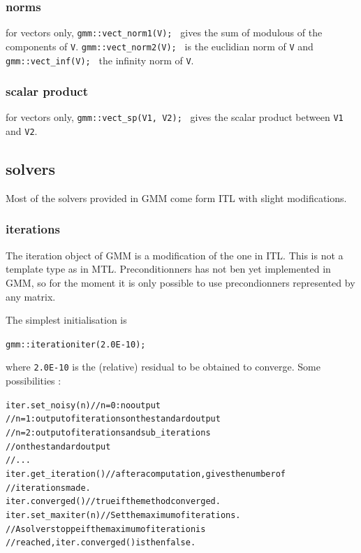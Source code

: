 \documentclass[11pt,a4paper]{article}
\begin{document}
\subsubsection{norms}
  for vectors only, {\tt gmm::vect_norm1(V); } gives the sum of modulous of the components of {\tt V}. {\tt gmm::vect_norm2(V); } is the euclidian norm of {\tt V} and {\tt gmm::vect_inf(V); } the infinity norm of {\tt V}.

\subsubsection{scalar product}
  for vectors only, {\tt gmm::vect_sp(V1, V2); } gives the scalar product between {\tt V1} and {\tt V2}.


\subsection{solvers}
Most of the solvers provided in GMM come form ITL with slight modifications.

\subsubsection{iterations}
  The iteration object of GMM is a modification of the one in ITL. This is not a template type as in MTL. Preconditionners has not ben yet implemented in GMM, so for the moment it is only possible to use precondionners represented by any matrix. 

The simplest initialisation is
\begin{alltt}
  gmm::iteration iter(2.0E-10);
\end{alltt}
where {\tt 2.0E-10} is the (relative) residual to be obtained to converge.
Some possibilities :
\begin{alltt}
  iter.set_noisy(n) // n = 0 : no output
                    // n = 1 : output of iterations on the standard output
                    // n = 2 : output of iterations and sub_iterations 
                    //         on the standard output
                    // ...
  iter.get_iteration() // after a computation, gives the number of
                       // iterations made.
  iter.converged()     // true if the method converged.
  iter.set_maxiter(n)  // Set the maximum of iterations.
                       // A solver stoppe if the maximum of iteration is 
                       // reached, iter.converged() is then false.
\end{alltt}
\end{document}
